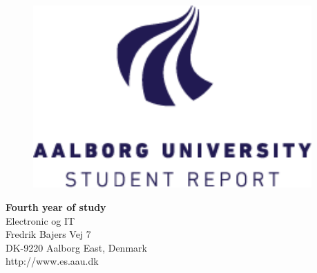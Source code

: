{}
\thispagestyle{empty}

\begin{minipage}[t]{0.48\textwidth}
\vspace*{-25pt}			%

\begin{figure}[H] 
\includegraphics[width=0.95\textwidth]{rapport/introduction/aau_logo1}
\end{figure} 
\end{minipage}
\hfill
\begin{minipage}[t]{0.48\textwidth}
{\small 
\textbf{Fourth year of study}  \\
Electronic og IT \\
Fredrik Bajers Vej 7 \\
DK-9220 Aalborg East, Denmark\\
http://www.es.aau.dk}
\end{minipage}


\vspace*{1cm}

